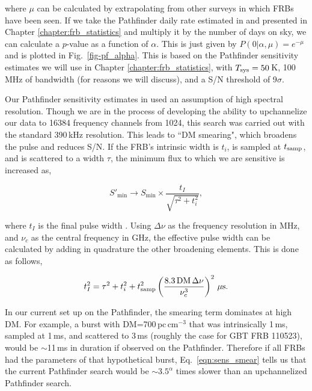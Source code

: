 \noindent where $\mu$ can be calculated by extrapolating 
from other surveys in which FRBs have been seen.  
If we take the Pathfinder daily rate estimated in 
\citep{2016MNRAS.460.1054C} and presented in 
Chapter \ref{chapter:frb_statistics} and multiply it by 
the number of days on sky, we can calculate a $p$-value
as a function of $\alpha$. This is just given by 
$P(0 | \alpha, \mu) = e^{-\mu}$ and is plotted in 
Fig.~\ref{fig-pf_alpha}. This is 
based on the Pathfinder sensitivity estimates we will use in Chapter 
\ref{chapter:frb_statistics}, with $T_{\rm sys}=50$\,K,
100\,MHz of bandwidth (for reasons we will 
discuss), and a S/N threshold of 9$\sigma$. 

Our Pathfinder sensitivity estimates in \citet{2016MNRAS.460.1054C} 
used an assumption of high spectral resolution.
Though we are in the process of developing the ability 
to upchannelize our data to 16384 frequency channels 
from 1024, this search was carried out with the standard 390\,kHz
resolution. This leads to ``DM smearing", which broadens 
the pulse and reduces S/N. If the FRB's intrinsic width 
is $t_i$, is sampled at $t_{\rm samp}$, and is scattered to a width $\tau$, 
the minimum flux to which we are sensitive is 
increased as,

\begin{equation}
S'_{\textrm{min}} \rightarrow S_{\textrm{min}} \times \frac{t_I}{\sqrt{\tau^2 + t^2_i}},
\label{eqn:sens_smear}
\end{equation}

\noindent where $t_I$ is the final pulse width
\citep{2014ApJ...792...19B}. 
Using $\Delta \nu$ as the frequency 
resolution in MHz, and $\nu_c$ as the central frequency in GHz, 
the effective pulse width can be calculated by 
adding in quadrature the other broadening elements.
This is done as follows,

\begin{equation}
t^2_I = \tau^2 + t^2_i + t^2_{\textrm{samp}} \left ( \frac{8.3\, \textrm{DM} \,
\Delta \nu}{\nu^3_c} \right )^2 \, \mu\rm s.
\label{eqn:smearing}
\end{equation}

In our current set up on the Pathfinder, the smearing term 
dominates at high DM. For example, a burst with DM=700\,pc\,cm$^{-3}$
that was intrinsically 1\,ms, sampled at 1\,ms, and scattered to 
3\,ms (roughly the case for GBT FRB 110523), would be $\sim$11\,ms
in duration if observed on the Pathfinder. Therefore if all FRBs
had the parameters of that hypothetical 
burst, Eq.~\ref{eqn:sens_smear} tells us that 
the current Pathfinder search would be $\sim3.5^\alpha$ times 
slower than an upchannelized Pathfinder search.

